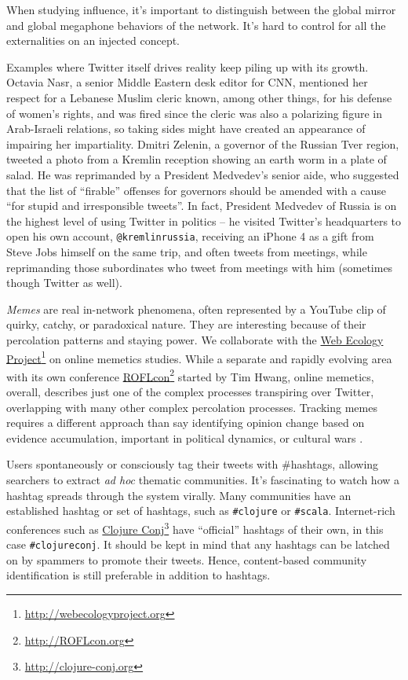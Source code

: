 \documentclass[10pt,oneside]{memoir}
\begin{document}
When studying influence, it's important to distinguish between the global mirror and global megaphone behaviors of the network.  It's hard to control for all the externalities on an injected concept.  


Examples where Twitter itself drives reality keep piling up with its growth.  Octavia Nasr, a senior Middle Eastern desk editor for CNN, mentioned her respect for a Lebanese Muslim cleric known, among other things, for his defense of women's rights, and was fired since the cleric was also a polarizing figure in Arab-Israeli relations, so taking sides might have created an appearance of impairing her impartiality.  Dmitri Zelenin, a governor of the Russian Tver region, tweeted a photo from a Kremlin reception showing an earth worm in a plate of salad.  He was reprimanded by a President Medvedev's senior aide, who suggested that the list of ``firable'' offenses for governors should be amended with a cause ``for stupid and irresponsible tweets''.  In fact, President Medvedev of Russia is on the highest level of using Twitter in politics -- he visited Twitter's headquarters to open his own account, \texttt{@kremlinrussia}, receiving an iPhone 4 as a gift from Steve Jobs himself on the same trip, and often tweets from meetings, while reprimanding those subordinates who tweet from meetings with him (sometimes though Twitter as well).


{\itshape Memes} are real in-network phenomena, often represented by a YouTube clip of quirky, catchy, or paradoxical nature.  They are interesting because of their percolation patterns and staying power.  We collaborate with the \href{http://webecologyproject.org}{Web Ecology Project}\footnote{\href{http://webecologyproject.org}{http://webecologyproject.org}} on online memetics studies.  While a separate and rapidly evolving area with its own conference \href{http://ROFLcon.org}{ROFLcon}\footnote{\href{http://ROFLcon.org}{http://ROFLcon.org}} started by Tim Hwang, online memetics, overall, describes just one  of the complex processes transpiring over Twitter, overlapping with many other complex percolation processes.  Tracking memes requires a different approach than say identifying opinion change based on evidence accumulation, important in political dynamics, or cultural wars \cite{Sudweeks:2010:Cultural}.


Users spontaneously or consciously tag their tweets with \#hashtags, allowing searchers to extract {\itshape ad hoc} thematic communities.  It's fascinating to watch how a hashtag spreads through the system virally.  Many communities have an established hashtag or set of hashtags, such as \texttt{\#clojure} or \texttt{\#scala}.  Internet-rich conferences such as \href{http://clojure-conj.org}{Clojure Conj}\footnote{\href{http://clojure-conj.org}{http://clojure-conj.org}} have ``official'' hashtags of their own, in this case \texttt{\#clojureconj}.   It should be kept in mind that any hashtags can be latched on by spammers to promote their tweets.  Hence, content-based community identification is still preferable in addition to hashtags.
\end{document}
